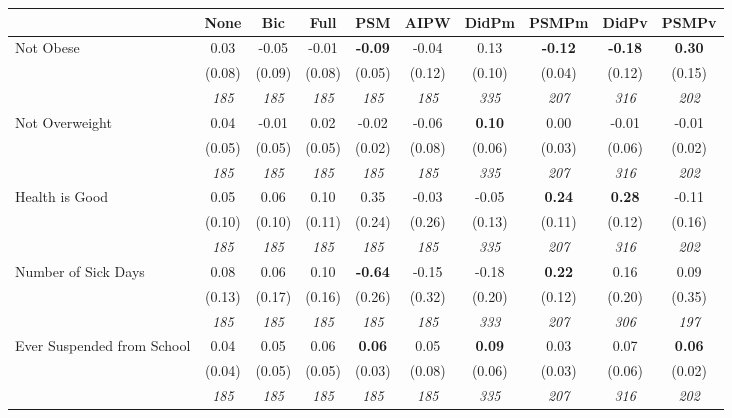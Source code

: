 \begin{tabular}{l c c c c c c c c c}
\toprule
 & None & Bic & Full & PSM & AIPW & DidPm & PSMPm & DidPv & PSMPv \\
\midrule
Not Obese & 0.03 & -0.05 & -0.01 & \textbf{-0.09} & -0.04 & 0.13 & \textbf{-0.12} & \textbf{ -0.18 } & \textbf{0.30} \\
& (0.08) & (0.09) & (0.08) & (0.05) & (0.12) & (0.10) & (0.04) & (0.12) & (0.15) \\
& \textit{ 185 } & \textit{ 185 } & \textit{ 185 } & \textit{ 185 } & \textit{ 185 } & \textit{ 335 } & \textit{ 207 } & \textit{ 316 } & \textit{ 202 } \\
Not Overweight & 0.04 & -0.01 & 0.02 & -0.02 & -0.06 & \textbf{ 0.10 } & 0.00 & -0.01 & -0.01 \\
& (0.05) & (0.05) & (0.05) & (0.02) & (0.08) & (0.06) & (0.03) & (0.06) & (0.02) \\
& \textit{ 185 } & \textit{ 185 } & \textit{ 185 } & \textit{ 185 } & \textit{ 185 } & \textit{ 335 } & \textit{ 207 } & \textit{ 316 } & \textit{ 202 } \\
Health is Good & 0.05 & 0.06 & 0.10 & 0.35 & -0.03 & -0.05 & \textbf{0.24} & \textbf{ 0.28 } & -0.11 \\
& (0.10) & (0.10) & (0.11) & (0.24) & (0.26) & (0.13) & (0.11) & (0.12) & (0.16) \\
& \textit{ 185 } & \textit{ 185 } & \textit{ 185 } & \textit{ 185 } & \textit{ 185 } & \textit{ 335 } & \textit{ 207 } & \textit{ 316 } & \textit{ 202 } \\
Number of Sick Days & 0.08 & 0.06 & 0.10 & \textbf{-0.64} & -0.15 & -0.18 & \textbf{0.22} & 0.16 & 0.09 \\
& (0.13) & (0.17) & (0.16) & (0.26) & (0.32) & (0.20) & (0.12) & (0.20) & (0.35) \\
& \textit{ 185 } & \textit{ 185 } & \textit{ 185 } & \textit{ 185 } & \textit{ 185 } & \textit{ 333 } & \textit{ 207 } & \textit{ 306 } & \textit{ 197 } \\
Ever Suspended from School & 0.04 & 0.05 & 0.06 & \textbf{0.06} & 0.05 & \textbf{ 0.09 } & 0.03 & 0.07 & \textbf{0.06} \\
& (0.04) & (0.05) & (0.05) & (0.03) & (0.08) & (0.06) & (0.03) & (0.06) & (0.02) \\
& \textit{ 185 } & \textit{ 185 } & \textit{ 185 } & \textit{ 185 } & \textit{ 185 } & \textit{ 335 } & \textit{ 207 } & \textit{ 316 } & \textit{ 202 } \\
\bottomrule
\end{tabular}

